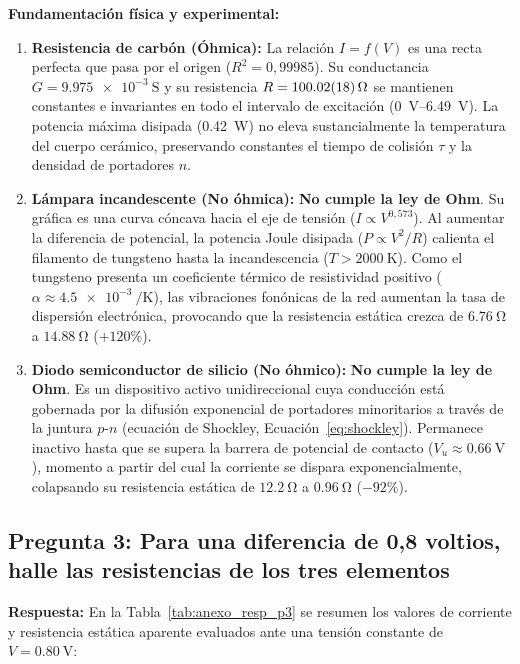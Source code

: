 \begin{appendices}
\textbf{Fundamentación física y experimental:}
\begin{enumerate}
    \item \textbf{Resistencia de carbón (Óhmica):} La relación $I = f(V)$ es una recta perfecta que pasa por el origen ($R^2 = 0{,}99985$). Su conductancia $G = \qty{9,975e-3}{\siemens}$ y su resistencia $R = \qty{100,02 \pm 0,18}{\ohm}$ se mantienen constantes e invariantes en todo el intervalo de excitación (\qtyrange{0}{6,49}{\volt}). La potencia máxima disipada (\qty{0,42}{\watt}) no eleva sustancialmente la temperatura del cuerpo cerámico, preservando constantes el tiempo de colisión $\tau$ y la densidad de portadores $n$.
    
    \item \textbf{Lámpara incandescente (No óhmica):} \textbf{No cumple la ley de Ohm}. Su gráfica es una curva cóncava hacia el eje de tensión ($I \propto V^{0{,}573}$). Al aumentar la diferencia de potencial, la potencia Joule disipada ($P \propto V^2 / R$) calienta el filamento de tungsteno hasta la incandescencia ($T > \qty{2000}{\kelvin}$). Como el tungsteno presenta un coeficiente térmico de resistividad positivo ($\alpha \approx \qty{4,5e-3}{\per\kelvin}$), las vibraciones fonónicas de la red aumentan la tasa de dispersión electrónica, provocando que la resistencia estática crezca de $\qty{6,76}{\ohm}$ a $\qty{14,88}{\ohm}$ ($+120\%$).
    
    \item \textbf{Diodo semiconductor de silicio (No óhmico):} \textbf{No cumple la ley de Ohm}. Es un dispositivo activo unidireccional cuya conducción está gobernada por la difusión exponencial de portadores minoritarios a través de la juntura $p$-$n$ (ecuación de Shockley, Ecuación~\eqref{eq:shockley}). Permanece inactivo hasta que se supera la barrera de potencial de contacto ($V_u \approx \qty{0,66}{\volt}$), momento a partir del cual la corriente se dispara exponencialmente, colapsando su resistencia estática de $\qty{12,2}{\ohm}$ a $\qty{0,96}{\ohm}$ ($-92\%$).
\end{enumerate}

\subsection{Pregunta 3: Para una diferencia de 0,8 voltios, halle las resistencias de los tres elementos}
\textbf{Respuesta:}  
En la Tabla~\ref{tab:anexo_resp_p3} se resumen los valores de corriente y resistencia estática aparente evaluados ante una tensión constante de $V = \qty{0,80}{\volt}$:


\end{appendices}
